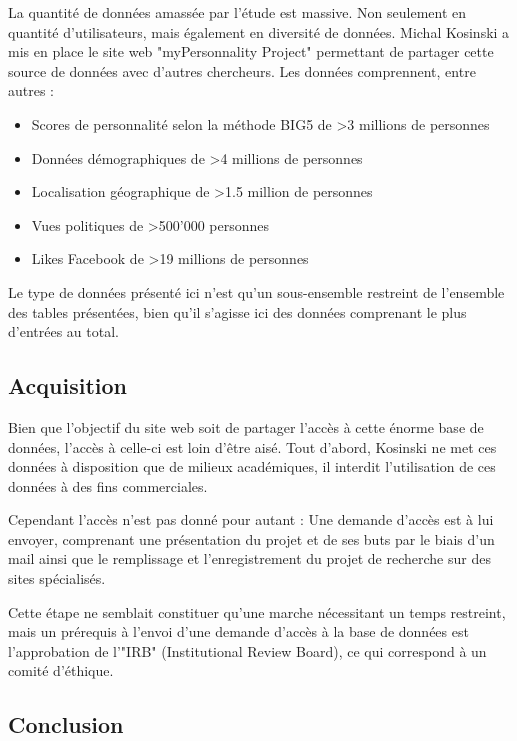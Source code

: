 		La quantité de données amassée par l'étude est massive. Non seulement en quantité d'utilisateurs, mais également en diversité de données. Michal Kosinski a mis en place le site web "myPersonnality Project"\cite{mypersonnality} permettant de partager cette source de données avec d'autres chercheurs. Les données comprennent, entre autres :

		\begin{itemize}
			\item Scores de personnalité selon la méthode BIG5 de >3 millions de personnes
			\item Données démographiques de >4 millions de personnes
			\item Localisation géographique de >1.5 million de personnes
			\item Vues politiques de >500'000 personnes
			\item Likes Facebook de >19 millions de personnes
		\end{itemize}

		Le type de données présenté ici n'est qu'un sous-ensemble restreint de l'ensemble des tables présentées, bien qu'il s'agisse ici des données comprenant le plus d'entrées au total.

	\subsection{Acquisition}

		Bien que l'objectif du site web soit de partager l'accès à cette énorme base de données, l'accès à celle-ci est loin d'être aisé. Tout d'abord, Kosinski ne met ces données à disposition que de milieux académiques, il interdit l'utilisation de ces données à des fins commerciales.

		Cependant l'accès n'est pas donné pour autant : Une demande d'accès est à lui envoyer, comprenant une présentation du projet et de ses buts par le biais d'un mail ainsi que le remplissage et l'enregistrement du projet de recherche sur des sites spécialisés.

		Cette étape ne semblait constituer qu'une marche nécessitant un temps restreint, mais un prérequis à l'envoi d'une demande d'accès à la base de données est l'approbation de l'"IRB" (Institutional Review Board), ce qui correspond à un comité d'éthique.

	\subsection{Conclusion}

